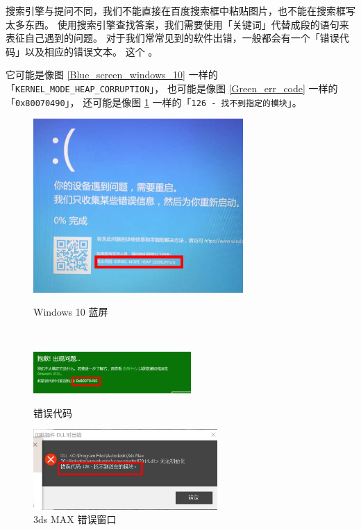 搜索引擎与提问不同，我们不能直接在百度搜索框中粘贴图片，也不能在搜索框写太多东西。
使用搜索引擎查找答案，我们需要使用「关键词」代替成段的语句来表征自己遇到的问题。
对于我们常常见到的软件出错，一般都会有一个「错误代码」以及相应的错误文本。
这个 。

它可能是像图 \ref{Blue_screen_windows_10} 一样的「\verb|KERNEL_MODE_HEAP_CORRUPTION|」，
也可能是像图 \ref{Green_err_code} 一样的「\verb|0x80070490|」，
还可能是像图 \ref{3Ds_Max_err_code} 一样的「\verb|126 - 找不到指定的模块|」。

\begin{figure}[htb!]
  \centering
  \begin{minipage}{10cm}
    \centering
    \includegraphics[width=8cm]{assets/Blue_screen_windows_10.png}
    \caption{Windows 10 蓝屏}
    \label{Blue_screen_windows_10}
  \end{minipage}
  \\\vspace*{1ex}
  \begin{minipage}{6.2cm}
    \centering
    \includegraphics[width=6cm]{assets/Green_err_code.png}
    \caption{错误代码}
    \label{Green_err_code}
  \end{minipage}
  \quad
  \begin{minipage}{7.2cm}
    \centering
    \includegraphics[width=7cm]{assets/3Ds_Max_err_code.png}
    \caption{3ds MAX 错误窗口}
    \label{3Ds_Max_err_code}
  \end{minipage}
\end{figure}

